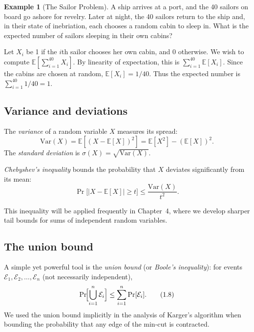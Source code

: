 \documentclass[twoside,12pt]{book}
\theoremstyle{plain}
\theoremstyle{definition}
\newtheorem{example}[theorem]{Example}
\theoremstyle{remark}
\begin{document}
\begin{example}[The Sailor Problem]
A ship arrives at a port, and the 40 sailors on board go ashore for
revelry. Later at night, the 40 sailors return to the ship and, in their
state of inebriation, each chooses a random cabin to sleep in. What is the
expected number of sailors sleeping in their own cabins?

Let $X_i$ be 1 if the $i$th sailor chooses her own cabin, and 0 otherwise.
We wish to compute $\mathbb{E}[\sum_{i=1}^{40} X_i]$. By linearity of
expectation, this is $\sum_{i=1}^{40} \mathbb{E}[X_i]$. Since the cabins
are chosen at random, $\mathbb{E}[X_i]=1/40$. Thus the expected number is
$\sum_{i=1}^{40} 1/40 = 1$.
\end{example}

\subsection{Variance and deviations}

The \emph{variance} of a random variable $X$ measures its spread:
\[
  \mathrm{Var}(X) = \mathbb{E}[(X - \mathbb{E}[X])^2]
                  = \mathbb{E}[X^2] - (\mathbb{E}[X])^2.
\]
The \emph{standard deviation} is $\sigma(X) = \sqrt{\mathrm{Var}(X)}$.

\emph{Chebyshev's inequality} bounds the probability that $X$ deviates
significantly from its mean:
\begin{equation*}
  \Pr\bigl[|X - \mathbb{E}[X]| \ge t\bigr]
  \le \frac{\mathrm{Var}(X)}{t^2}.
  \tag{1.7}
\end{equation*}

This inequality will be applied frequently in Chapter~4, where we develop
sharper tail bounds for sums of independent random variables.

\subsection{The union bound}

A simple yet powerful tool is the \emph{union bound} (or \emph{Boole's
inequality}): for events $\mathcal{E}_1, \mathcal{E}_2, \ldots,
\mathcal{E}_n$ (not necessarily independent),
\begin{equation*}
  \Pr\!\Bigl[\bigcup_{i=1}^{n} \mathcal{E}_i\Bigr]
  \le \sum_{i=1}^{n} \Pr[\mathcal{E}_i].
  \tag{1.8}
\end{equation*}
We used the union bound implicitly in the analysis of Karger's algorithm
when bounding the probability that any edge of the min-cut is contracted.
\end{document}
